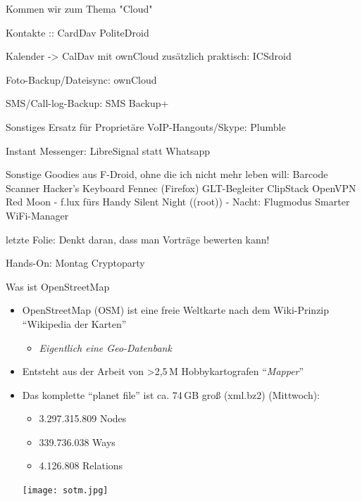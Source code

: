 \documentclass{beamer}
\begin{document}
  Kommen wir zum Thema "Cloud"

  Kontakte :: CardDav
    PoliteDroid

   Kalender -> CalDav mit ownCloud 
     zusätzlich praktisch: ICSdroid
  
   Foto-Backup/Dateisync: ownCloud

   SMS/Call-log-Backup: SMS Backup+ 
    
 Sonstiges
   Ersatz für Proprietäre VoIP-Hangouts/Skype: Plumble

  Instant Messenger: LibreSignal statt Whatsapp

Sonstige Goodies aus F-Droid, ohne die ich nicht mehr leben will:
  Barcode Scanner
  Hacker's Keyboard
  Fennec (Firefox)
  GLT-Begleiter
  ClipStack
  OpenVPN
  Red Moon - f.lux fürs Handy
  Silent Night ((root)) - Nacht: Flugmodus
  Smarter WiFi-Manager


letzte Folie:
  Denkt daran, dass man Vorträge bewerten kann!

  Hands-On: Montag Cryptoparty



\begin{frame}{Was ist OpenStreetMap}

\begin{itemize}
  \item OpenStreetMap (OSM) ist eine freie Weltkarte nach dem Wiki-Prinzip "`Wikipedia der Karten"'
    \begin{itemize}
      \item \emph{Eigentlich eine Geo-Datenbank}
    \end{itemize}
\pause
  \item Entsteht aus der Arbeit von \textgreater 2,5\,M Hobbykartografen "`\emph{Mapper}"'

 \item Das komplette "`planet file"' ist ca. 74\,GB groß (xml.bz2) (Mittwoch):
  \begin{itemize}
    \item 3.297.315.809 Nodes
    \item 339.736.038 Ways
    \item 4.126.808 Relations
  \end{itemize}

 \begin{center}
 \texttt{[image: sotm.jpg]}
 \end{center}

\end{itemize}

\end{frame}
\end{document}
